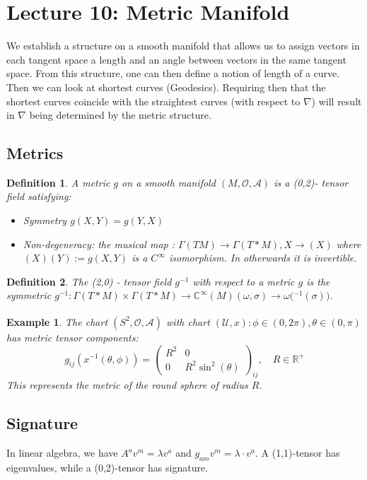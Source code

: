 \documentclass[10pt, oneside]{article}
\newcommand{\R}{\mathbb{R}}
\newcommand{\C}{\mathbb{C}}
\newtheorem{defn}{Definition}
\newtheorem{example}{Example}
\begin{document}
\section{Lecture 10: Metric Manifold \cite{MetricManifolds}}
We establish a structure on a smooth manifold that allows us to assign vectors in each tangent space a length and an angle between vectors in the same tangent space. From this structure, one can then define a notion of length of a curve. Then we can look at shortest curves (Geodesics).
Requiring then that the shortest curves coincide with the straightest curves (with respect to $\nabla$) will result in $\nabla$ being determined by the metric structure.
\subsection{Metrics}
\begin{defn}
  A metric $g$ on a smooth manifold $(M, \mathcal{O}, \mathcal{A})$ is a (0,2)- tensor field satisfying:
  \begin{itemize}
     \item Symmetry $g(X,Y) = g(Y,X)$
     \item Non-degeneracy: the musical map \musFlat{}: $\Gamma(TM) \to \Gamma(T*M), X \to $\musFlat$(X)$ where \musFlat$(X) (Y) := g(X,Y)$ is a $C^\infty$ isomorphism. In otherwards it is invertible.
  \end{itemize}
\end{defn}
\begin{defn}
The (2,0) - tensor field $g^{-1}$ with respect to a metric $g$ is the symmetric $g^{-1}: \Gamma(T*M) \times \Gamma(T*M) \xrightarrow[]{~} \C^\infty(M) (\omega, \sigma) \to \omega($\musFlat$^{-1}(\sigma))$.
\end{defn}
\begin{example}
The chart $(S^2,\mathcal{O},\mathcal{A})$ with chart $(\mathcal{U},x)\colon \phi \in (0, 2 \pi), \theta \in (0, \pi)$ has metric tensor components:
\[ g_{ij}(x^{-1} (\theta, \phi)) = \begin{pmatrix}
R^2 & 0 \\
0 & R^2 \sin^2(\theta)
\end{pmatrix}_{ij}, \quad R \in \R^+
\]
This represents the metric of the round sphere of radius $R$.
\end{example}


\subsection{Signature}
In linear algebra, we have $A^a v^m = \lambda v^a$ and $g_{am} v^m = \lambda \cdot v^a$.
A (1,1)-tensor has eigenvalues, while a (0,2)-tensor has signature.
\end{document}
